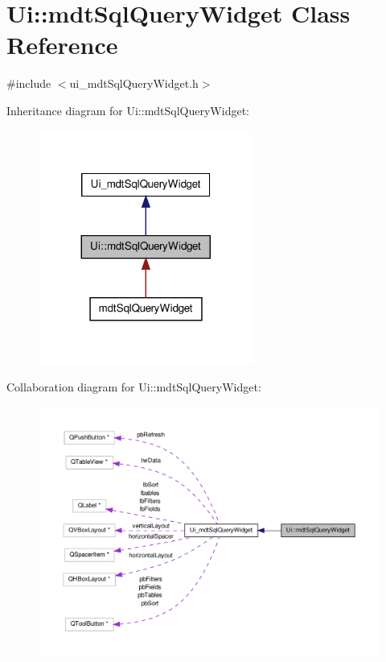 \hypertarget{class_ui_1_1mdt_sql_query_widget}{\section{Ui\-:\-:mdt\-Sql\-Query\-Widget Class Reference}
\label{class_ui_1_1mdt_sql_query_widget}
}


{\ttfamily \#include $<$ui\-\_\-mdt\-Sql\-Query\-Widget.\-h$>$}



Inheritance diagram for Ui\-:\-:mdt\-Sql\-Query\-Widget\-:
\nopagebreak
\begin{figure}[H]
\begin{center}
\leavevmode
\includegraphics[width=200pt]{class_ui_1_1mdt_sql_query_widget__inherit__graph}
\end{center}
\end{figure}


Collaboration diagram for Ui\-:\-:mdt\-Sql\-Query\-Widget\-:
\nopagebreak
\begin{figure}[H]
\begin{center}
\leavevmode
\includegraphics[width=350pt]{class_ui_1_1mdt_sql_query_widget__coll__graph}
\end{center}
\end{figure}
